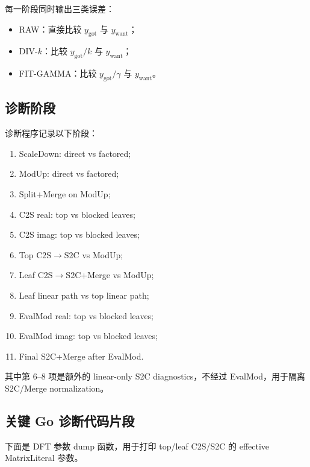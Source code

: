 \documentclass[UTF8,a4paper,11pt]{ctexart}
\begin{document}
每一阶段同时输出三类误差：
\begin{itemize}[leftmargin=2em]
\item RAW：直接比较 $y_{\mathrm{got}}$ 与 $y_{\mathrm{want}}$；
\item DIV-$k$：比较 $y_{\mathrm{got}}/k$ 与 $y_{\mathrm{want}}$；
\item FIT-GAMMA：比较 $y_{\mathrm{got}}/\widehat{\gamma}$ 与 $y_{\mathrm{want}}$。
\end{itemize}

\subsection{诊断阶段}

诊断程序记录以下阶段：
\begin{enumerate}[leftmargin=2em]
\item ScaleDown: direct vs factored;
\item ModUp: direct vs factored;
\item Split+Merge on ModUp;
\item C2S real: top vs blocked leaves;
\item C2S imag: top vs blocked leaves;
\item Top C2S$\to$S2C vs ModUp;
\item Leaf C2S$\to$S2C+Merge vs ModUp;
\item Leaf linear path vs top linear path;
\item EvalMod real: top vs blocked leaves;
\item EvalMod imag: top vs blocked leaves;
\item Final S2C+Merge after EvalMod.
\end{enumerate}

其中第 6--8 项是额外的 linear-only S2C diagnostics，不经过 EvalMod，用于隔离 S2C/Merge normalization。

\subsection{关键 Go 诊断代码片段}

下面是 DFT 参数 dump 函数，用于打印 top/leaf C2S/S2C 的 effective MatrixLiteral 参数。
\end{document}
